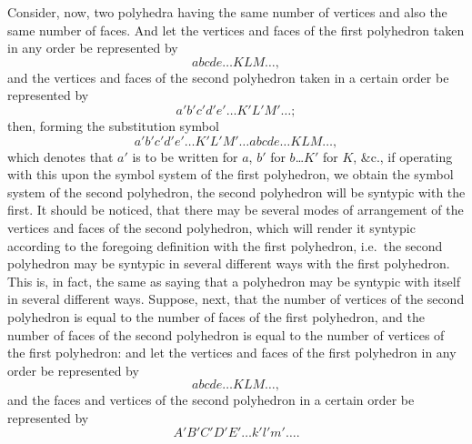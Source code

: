 \documentclass[11pt]{article}
\begin{document}
\begin{center}
\end{center}

\medskip

Consider, now, two polyhedra having the same number of vertices and also the same number of faces. And let the vertices and faces of the first polyhedron taken in any order be represented by
\[
abcde\ldots KLM\ldots,
\]
and the vertices and faces of the second polyhedron taken in a certain order be represented by
\[
a'b'c'd'e'\ldots K'L'M'\ldots;
\]
then, forming the substitution symbol
\[
a'b'c'd'e'\ldots K'L'M'\ldots abcde\ldots KLM\ldots,
\]
which denotes that $a'$ is to be written for $a$, $b'$ for $b$\ldots $K'$ for $K$, \&c., if operating with this upon the symbol system of the first polyhedron, we obtain the symbol system of the second polyhedron, the second polyhedron will be syntypic with the first. It should be noticed, that there may be several modes of arrangement of the vertices and faces of the second polyhedron, which will render it syntypic according to the foregoing definition with the first polyhedron, i.e.\ the second polyhedron may be syntypic in several different ways with the first polyhedron. This is, in fact, the same as saying that a polyhedron may be syntypic with itself in several different ways. Suppose, next, that the number of vertices of the second polyhedron is equal to the number of faces of the first polyhedron, and the number of faces of the second polyhedron is equal to the number of vertices of the first polyhedron: and let the vertices and faces of the first polyhedron in any order be represented by
\[
abcde\ldots KLM\ldots,
\]
and the faces and vertices of the second polyhedron in a certain order be represented by
\[
A'B'C'D'E'\ldots k'l'm'\ldots.
\]
\end{document}
